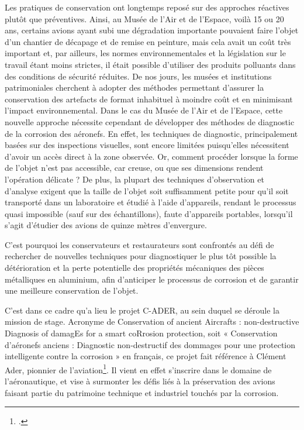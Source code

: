 \documentclass[a4paper,12pt,twoside]{book}
\begin{document}
Les pratiques de conservation ont longtemps reposé sur des approches réactives plutôt que préventives. Ainsi, au Musée de l’Air et de l’Espace, voilà 15 ou 20 ans, certains avions ayant subi une dégradation importante pouvaient faire l’objet d’un chantier de décapage et de remise en peinture, mais cela avait un coût très important et, par ailleurs, les normes environnementales et la législation sur le travail étant moins strictes, il était possible d’utiliser des produits polluants dans des conditions de sécurité réduites. De nos jours, les musées et institutions patrimoniales cherchent à adopter des méthodes permettant d’assurer la conservation des artefacts de format inhabituel à moindre coût et en minimisant l’impact environnemental. Dans le cas du Musée de l’Air et de l’Espace, cette nouvelle approche nécessite cependant de développer des méthodes de diagnostic de la corrosion des aéronefs. En effet, les techniques de diagnostic, principalement basées sur des inspections visuelles, sont encore limitées puisqu'elles nécessitent d’avoir un accès direct à la zone observée. Or, comment procéder lorsque la forme de l'objet n'est pas accessible, car creuse, ou que ses dimensions rendent l'opération délicate ? De plus, la plupart des techniques d'observation et d'analyse exigent que la taille de l'objet soit suffisamment petite pour qu'il soit transporté dans un laboratoire et étudié à l'aide d'appareils, rendant le processus quasi impossible (sauf sur des échantillons), faute d'appareils portables, lorsqu'il s'agit d'étudier des avions de quinze mètres d'envergure. 

C'est pourquoi les conservateurs et restaurateurs sont confrontés au défi de rechercher de nouvelles techniques pour diagnostiquer le plus tôt possible la détérioration et la perte potentielle des propriétés mécaniques des pièces métalliques en aluminium, afin d'anticiper le processus de corrosion et de garantir une meilleure conservation de l'objet. 

C'est dans ce cadre qu’a lieu le projet C-ADER, au sein duquel se déroule la mission de stage. Acronyme de Conservation of ancient Aircrafts : non-destructive Diagnosis of damagEs for a smart coRrosion protection, soit « Conservation d'aéronefs anciens : Diagnostic non-destructif des dommages pour une protection intelligente contre la corrosion » en français, ce projet fait référence à Clément Ader, pionnier de l’aviation\footcite{ClementAder2024}. Il vient en effet s’inscrire dans le domaine de l’aéronautique, et vise à surmonter les défis liés à la préservation des avions faisant partie du patrimoine technique et industriel touchés par la corrosion.
\end{document}
